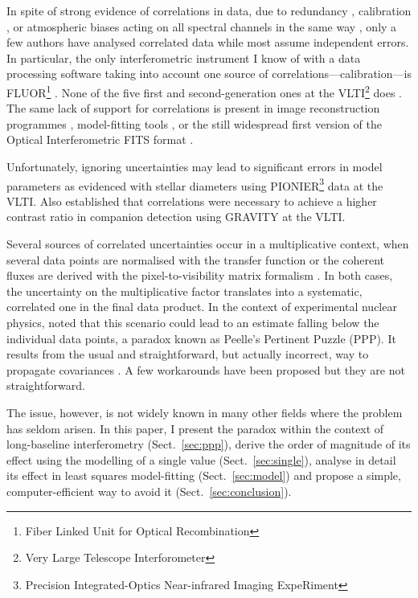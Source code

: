 \documentclass{pasa}
\begin{document}
In spite of strong evidence of correlations in data, due to redundancy \citep[][in the case of closure phases]{MON07}, calibration \citep{PER03}, or atmospheric biases acting on all spectral channels in the same way \citep{LAW00}, only a few authors \citep{PER04,ABS06,BER06,LAC19,KAM20} have analysed correlated data while most assume independent errors.  In particular, the only interferometric instrument I know of with a data processing software taking into account one source of correlations---calibration---is FLUOR\footnote{Fiber Linked Unit for Optical Recombination} \citep[at IOTA\footnote{Infrared and Optical Telescope Array}, then CHARA\footnote{Center for High Angular Resolution Array}, ][]{PER04}. None of the five first and second-generation ones at the VLTI\footnote{Very Large Telescope Interforometer} does \citep{AMBER,MIDI,PIONIER,GRAVITYpipe,MATISSEpipe}.  The same lack of support for correlations is present in image reconstruction programmes \citep[e.g. MIRA, see][]{THI08}, model-fitting tools \citep[e.g. Litpro, see][]{TAL08}, or the still widespread first version of the Optical Interferometric FITS format \citep[OIFITS v. 1,][]{OIFITS1}.

Unfortunately, ignoring uncertainties may lead to significant errors in model parameters as \citet{LAC19} evidenced with stellar diameters using PIONIER\footnote{Precision Integrated-Optics Near-infrared Imaging ExpeRiment} \citep{PIONIER} data at the VLTI. Also \citet{KAM20} established that correlations were necessary to achieve a higher contrast ratio in companion detection using GRAVITY \citep{GRAVITY} at the VLTI. 

Several sources of correlated uncertainties occur in a multiplicative context, when several data points are normalised with the transfer function \citep{PER03} or the coherent fluxes are derived with the pixel-to-visibility matrix formalism \citep{TAT07}.  In both cases, the uncertainty on the multiplicative factor translates into a systematic, correlated one in the final data product. In the context of experimental nuclear physics, \citet{PEE87} noted that this scenario could lead to an estimate falling below the individual data points, a paradox known as Peelle's Pertinent Puzzle (PPP). It results from the usual and straightforward, but actually incorrect, way to propagate covariances \citep{DAG94,NEU12}.  A few workarounds have been proposed \citep[e.g.][]{BUR11,BEC12,NIS14} but they are not straightforward.

The issue, however, is not widely known in many other fields where the problem has seldom arisen.  In this paper, I present the paradox within the context of long-baseline interferometry (Sect.~\ref{sec:ppp}), derive the order of magnitude of its effect using the modelling of a single value (Sect.~\ref{sec:single}), analyse in detail its effect in least squares model-fitting (Sect.~\ref{sec:model}) and propose a simple, computer-efficient way to avoid it (Sect.~\ref{sec:conclusion}).  
\end{document}
